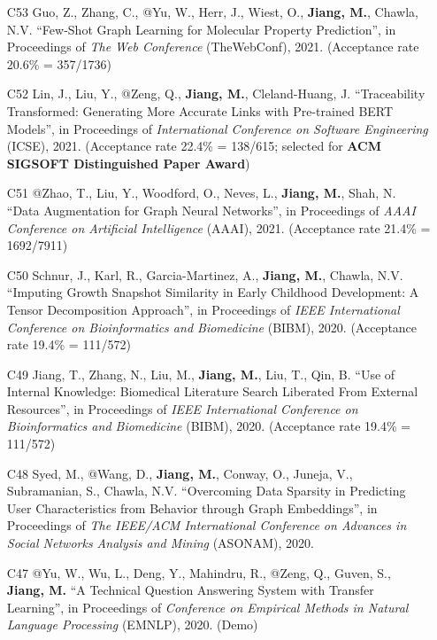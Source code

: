 \documentclass[10pt]{article}
\newenvironment{myindentpar}[1]%
{\begin{list}{}%
         {\setlength{\leftmargin}{#1}}%
         \item[]%
}
{\end{list}}
\newcounter{list}
\begin{document}
\begin{myindentpar}{0.00cm}
\begin{enumerate}[leftmargin=.5cm]
\item[C53] Guo, Z., Zhang, C., @Yu, W., Herr, J., Wiest, O., \textbf{Jiang, M.}, Chawla, N.V. ``Few-Shot Graph Learning for Molecular Property Prediction'', in Proceedings of \textit{The Web Conference} (TheWebConf), 2021. (Acceptance rate 20.6\% = 357/1736)

\item[C52] Lin, J., Liu, Y., @Zeng, Q., \textbf{Jiang, M.}, Cleland-Huang, J. ``Traceability Transformed: Generating More Accurate Links with Pre-trained BERT Models'', in Proceedings of \textit{International Conference on Software Engineering} (ICSE), 2021. (Acceptance rate 22.4\% = 138/615; selected for \textbf{ACM SIGSOFT Distinguished Paper Award})

\item[C51] @Zhao, T., Liu, Y., Woodford, O., Neves, L., \textbf{Jiang, M.}, Shah, N. ``Data Augmentation for Graph Neural Networks'', in Proceedings of \textit{AAAI Conference on Artificial Intelligence} (AAAI), 2021. (Acceptance rate 21.4\% = 1692/7911)

\item[C50] Schnur, J., Karl, R., Garcia-Martinez, A., \textbf{Jiang, M.}, Chawla, N.V. ``Imputing Growth Snapshot Similarity in Early Childhood Development: A Tensor Decomposition Approach'', in Proceedings of \textit{IEEE International Conference on Bioinformatics and Biomedicine} (BIBM), 2020. (Acceptance rate 19.4\% = 111/572)

\item[C49] Jiang, T., Zhang, N., Liu, M., \textbf{Jiang, M.}, Liu, T., Qin, B. ``Use of Internal Knowledge: Biomedical Literature Search Liberated From External Resources'', in Proceedings of \textit{IEEE International Conference on Bioinformatics and Biomedicine} (BIBM), 2020. (Acceptance rate 19.4\% = 111/572)

\item[C48] Syed, M., @Wang, D., \textbf{Jiang, M.}, Conway, O., Juneja, V., Subramanian, S., Chawla, N.V. ``Overcoming Data Sparsity in Predicting User Characteristics from Behavior through Graph Embeddings'', in Proceedings of \textit{The IEEE/ACM International Conference on Advances in Social Networks Analysis and Mining} (ASONAM), 2020.

\item[C47] @Yu, W., Wu, L., Deng, Y., Mahindru, R., @Zeng, Q., Guven, S., \textbf{Jiang, M.} ``A Technical Question Answering System with Transfer Learning'', in Proceedings of \textit{Conference on Empirical Methods in Natural Language Processing} (EMNLP), 2020. (Demo)
		

\end{enumerate}
\end{myindentpar}
\end{document}
